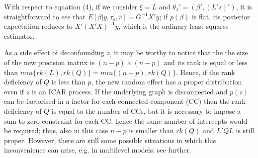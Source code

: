 \documentclass{article}
\begin{document}
With respect to equation (4), if we consider $\xi = L$ and $\theta_1' = (\beta', (L'z)')$, it is straightforward to see that $E[\beta|y, \tau_{\varepsilon}, \bar{r}] = G^{-1} X'y$; if $p(\beta)$ is flat, its posterior expectation reduces to $X'(X'X)^{-1}y$, which is the ordinary least squares estimator.

As a side effect of deconfounding $z$, it may be worthy to notice that the the size of the new precision matrix is $(n-p) \times (n-p)$ and its rank is equal or less than $min \lbrace rk(L), rk(Q) \rbrace =min \lbrace (n-p), rk(Q) \rbrace$. Hence, if the rank deficiency of $Q$ is less than $p$, the new random effect has a proper distribution even if $z$ is an ICAR process. If the underlying graph is disconnected and $p(z)$ can be factorised in a factor for each connected component (CC) then the rank deficiency of $Q$ is equal to the number of CCs, but it is necessary to impose a sum to zero constraint for each CC, hence the same number of intercepts would be required; thus, also in this case $n-p$ is smaller than $rk(Q)$ and $L'QL$ is still proper.
However, there are still some possible situations in which this inconvenience can arise, e.g. in multilevel models; see further.


\end{document}
